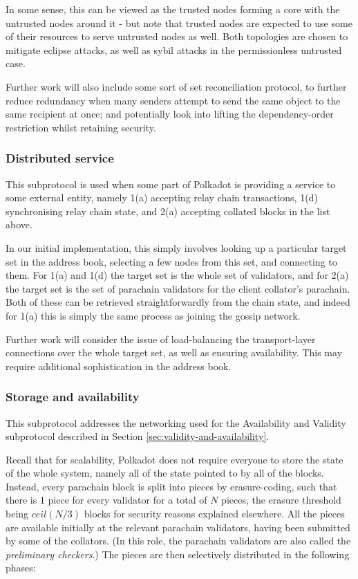 \documentclass{article}
\begin{document}
In some sense, this can be viewed as the trusted nodes forming a core with the untrusted nodes around it - but note that trusted nodes are expected to use some of their resources to serve untrusted nodes as well. Both topologies are chosen to mitigate eclipse attacks, as well as sybil attacks in the permissionless untrusted case.

Further work will also include some sort of set reconciliation protocol, to further reduce redundancy when many senders attempt to send the same object to the same recipient at once; and potentially look into lifting the dependency-order restriction whilst retaining security.

\subsubsection{Distributed service} \label{sec:net_service}

This subprotocol is used when some part of Polkadot is providing a service to some external entity, namely 1(a) accepting relay chain transactions, 1(d) synchronising relay chain state, and 2(a) accepting collated blocks in the list above.

In our initial implementation, this simply involves looking up a particular target set in the address book, selecting a few nodes from this set, and connecting to them. For 1(a) and 1(d) the target set is the whole set of validators, and for 2(a) the target set is the set of parachain validators for the client collator's parachain. Both of these can be retrieved straightforwardly from the chain state, and indeed for 1(a) this is simply the same process as joining the gossip network.

Further work will consider the issue of load-balancing the transport-layer connections over the whole target set, as well as ensuring availability. This may require additional sophistication in the address book.

\subsubsection{Storage and availability} \label{sec:net_storage}

This subprotocol addresses the networking used for the Availability and Validity subprotocol described in Section \ref{sec:validity-and-availability}.

Recall that for scalability, Polkadot does not require everyone to store the state of the whole system, namely all of the state pointed to by all of the blocks. Instead, every parachain block is split into pieces by erasure-coding, such that there is 1 piece for every validator for a total of $N$ pieces, the erasure threshold being $ceil(N/3)$ blocks for security reasons explained elsewhere. All the pieces are available initially at the relevant parachain validators, having been submitted by some of the collators. (In this role, the parachain validators are also called the \emph{preliminary checkers}.) The pieces are then selectively distributed in the following phases:
\end{document}
